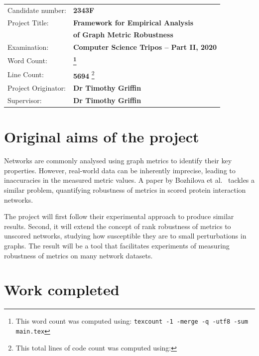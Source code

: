 \documentclass[12pt,a4paper,twoside,openany]{report}
\begin{document}
    {\large
        \begin{savenotes}
            \begin{tabular}{ll}
                Candidate number: & \textbf{2343F}                            \\
                Project Title: & \textbf{Framework for Empirical Analysis} \\ & \textbf{of Graph Metric Robustness}                    \\
                Examination: & \textbf{Computer Science Tripos -- Part II, 2020} \\
                Word Count: & \textbf{\footnote{This word count was computed using: \texttt{texcount -1 -merge -q -utf8 -sum main.tex}}}                                    \\
                Line Count: & \textbf{5694} \footnote{This total lines of code count was computed using: } \\
                Project Originator: & \textbf{Dr Timothy Griffin}                               \\
                Supervisor: & \textbf{Dr Timothy Griffin}                                        \\
            \end{tabular}
        \end{savenotes}
    }

    \section*{Original aims of the project}

    Networks are commonly analysed using graph metrics to identify their key properties.
    However, real-world data can be inherently imprecise, leading to inaccuracies in the measured metric values.
    A paper by Bozhilova et al.~\cite{Bozhilova2019} tackles a similar problem, quantifying robustness of metrics in scored protein interaction networks.

    The project will first follow their experimental approach to produce similar results.
    Second, it will extend the concept of rank robustness of metrics to unscored networks, studying how susceptible they are to small perturbations in graphs.
    The result will be a tool that facilitates experiments of measuring robustness of metrics on many network datasets.


    \section*{Work completed}
\end{document}
